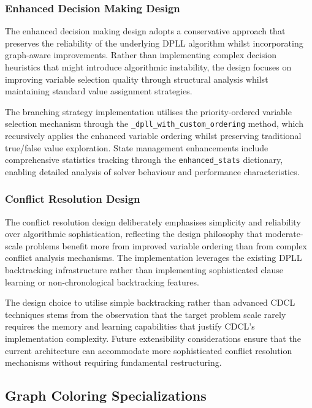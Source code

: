 \subsubsection{Enhanced Decision Making Design}

The enhanced decision making design adopts a conservative approach that preserves the reliability of the underlying DPLL algorithm whilst incorporating graph-aware improvements. Rather than implementing complex decision heuristics that might introduce algorithmic instability, the design focuses on improving variable selection quality through structural analysis whilst maintaining standard value assignment strategies.

The branching strategy implementation utilises the priority-ordered variable selection mechanism through the \texttt{\_dpll\_with\_custom\_ordering} method, which recursively applies the enhanced variable ordering whilst preserving traditional true/false value exploration. State management enhancements include comprehensive statistics tracking through the \texttt{enhanced\_stats} dictionary, enabling detailed analysis of solver behaviour and performance characteristics.

\subsubsection{Conflict Resolution Design}

The conflict resolution design deliberately emphasises simplicity and reliability over algorithmic sophistication, reflecting the design philosophy that moderate-scale problems benefit more from improved variable ordering than from complex conflict analysis mechanisms. The implementation leverages the existing DPLL backtracking infrastructure rather than implementing sophisticated clause learning or non-chronological backtracking features.

The design choice to utilise simple backtracking rather than advanced CDCL techniques stems from the observation that the target problem scale rarely requires the memory and learning capabilities that justify CDCL's implementation complexity. Future extensibility considerations ensure that the current architecture can accommodate more sophisticated conflict resolution mechanisms without requiring fundamental restructuring.

\subsection{Graph Coloring Specializations}

